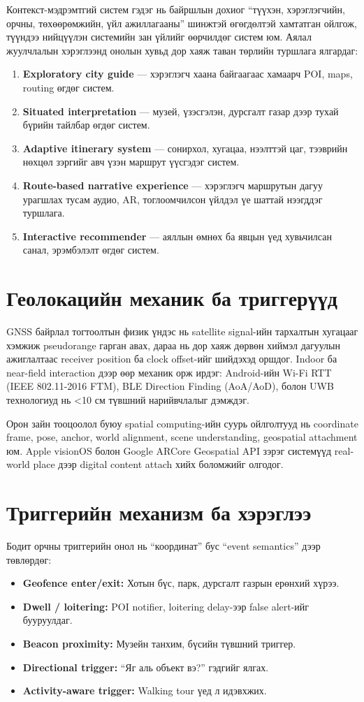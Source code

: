 \begin{sloppy}
Контекст-мэдрэмтгий систем гэдэг нь байршлын дохиог ``түүхэн, хэрэглэгчийн, орчны, төхөөрөмжийн, үйл ажиллагааны'' шинжтэй өгөгдөлтэй хамтатган ойлгож, түүндээ нийцүүлэн системийн зан үйлийг өөрчилдөг систем юм. Аялал жуулчлалын хэрэглээнд онолын хувьд дор хаяж таван төрлийн туршлага ялгардаг:
\begin{enumerate}
    \item \textbf{Exploratory city guide} — хэрэглэгч хаана байгаагаас хамаарч POI, maps, routing өгдөг систем.
    \item \textbf{Situated interpretation} — музей, үзэсгэлэн, дурсгалт газар дээр тухай бүрийн тайлбар өгдөг систем.
    \item \textbf{Adaptive itinerary system} — сонирхол, хугацаа, нээлттэй цаг, тээврийн нөхцөл зэргийг авч үзэн маршрут үүсгэдэг систем.
    \item \textbf{Route-based narrative experience} — хэрэглэгч маршрутын дагуу урагшлах тусам аудио, AR, тоглоомчилсон үйлдэл үе шаттай нээгддэг туршлага.
    \item \textbf{Interactive recommender} — аяллын өмнөх ба явцын үед хувьчилсан санал, эрэмбэлэлт өгдөг систем.
\end{enumerate}

\section*{Геолокацийн механик ба триггерүүд}
GNSS байрлал тогтоолтын физик үндэс нь satellite signal-ийн тархалтын хугацааг хэмжиж pseudorange гарган авах, дараа нь дор хаяж дөрвөн хиймэл дагуулын ажиглалтаас receiver position ба clock offset-ийг шийдэхэд оршдог. Indoor ба near-field interaction дээр өөр механик орж ирдэг: Android-ийн Wi-Fi RTT (IEEE 802.11-2016 FTM), BLE Direction Finding (AoA/AoD), болон UWB технологиуд нь <10 см түвшний нарийвчлалыг дэмждэг.

Орон зайн тооцоолол буюу spatial computing-ийн суурь ойлголтууд нь coordinate frame, pose, anchor, world alignment, scene understanding, geospatial attachment юм. Apple visionOS болон Google ARCore Geospatial API зэрэг системүүд real-world place дээр digital content attach хийх боломжийг олгодог.

\section*{Триггерийн механизм ба хэрэглээ}
Бодит орчны триггерийн онол нь ``координат'' бус ``event semantics'' дээр төвлөрдөг:
\begin{itemize}
    \item \textbf{Geofence enter/exit:} Хотын бүс, парк, дурсгалт газрын ерөнхий хүрээ.
    \item \textbf{Dwell / loitering:} POI notifier, loitering delay-ээр false alert-ийг бууруулдаг.
    \item \textbf{Beacon proximity:} Музейн танхим, бүсийн түвшний триггер.
    \item \textbf{Directional trigger:} ``Яг аль объект вэ?'' гэдгийг ялгах.
    \item \textbf{Activity-aware trigger:} Walking tour үед л идэвхжих.
\end{itemize}


\end{sloppy}
